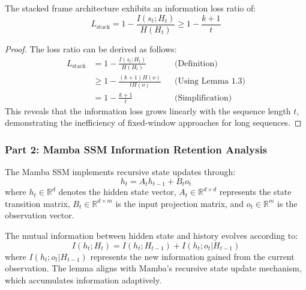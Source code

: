 \begin{proposition}
The stacked frame architecture exhibits an information loss ratio of:
\begin{equation}
    L_{\text{stack}} = 1 - \frac{I(s_t; H_t)}{H(H_t)} \geq 1 - \frac{k + 1}{t}
\end{equation}
\end{proposition}

\begin{proof}
The loss ratio can be derived as follows:
\begin{align}
    L_{\text{stack}} &= 1 - \frac{I(s_t; H_t)}{H(H_t)} && \text{(Definition)} \\
    &\geq 1 - \frac{(k + 1)H(o)}{tH(o)} && \text{(Using Lemma 1.3)} \\
    &= 1 - \frac{k + 1}{t} && \text{(Simplification)}
\end{align}
This reveals that the information loss grows linearly with the sequence length $t$, demonstrating the inefficiency of fixed-window approaches for long sequences.
\end{proof}

\subsubsection{Part 2: Mamba SSM Information Retention Analysis}

\begin{definition}
The Mamba SSM implements recursive state updates through:
\begin{equation}
    h_t = A_th_{t-1} + B_to_t
\end{equation}
where $h_t \in \mathbb{R}^d$ denotes the hidden state vector, $A_t \in \mathbb{R}^{d \times d}$ represents the state transition matrix, $B_t \in \mathbb{R}^{d \times m}$ is the input projection matrix, and $o_t \in \mathbb{R}^m$ is the observation vector.
\end{definition}

\begin{lemma}
The mutual information between hidden state and history evolves according to:
\begin{equation}
    I(h_t; H_t) = I(h_t; H_{t-1}) + I(h_t; o_t|H_{t-1})
\end{equation}
where $I(h_t; o_t|H_{t-1})$ represents the new information gained from the current observation. The lemma aligns with Mamba’s recursive state update mechanism, which accumulates information adaptively.
\end{lemma}

